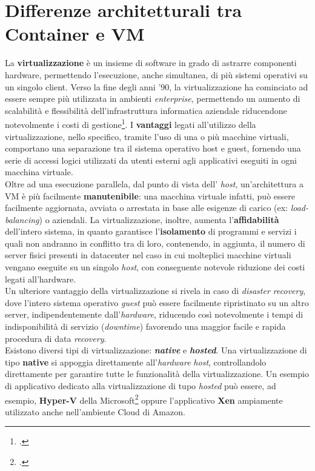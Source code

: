 \section{Differenze architetturali tra Container e VM}
La \textbf{virtualizzazione} è un insieme di software in grado di astrarre componenti \gls{hardware}, permettendo l'esecuzione, anche simultanea, di più \gls{sistemi operativi} su un singolo \gls{client}. Verso la fine degli anni '90, la virtualizzazione ha cominciato ad essere sempre più utilizzata in ambienti \textit{enterprise}, permettendo un aumento di scalabilità e flessibilità dell'infrastruttura informatica aziendale riducendone notevolmente i costi di gestione\footcite{fonte: https://www.vmware.com/it/solutions/virtualization.html}. I \textbf{vantaggi} legati all'utilizzo della virtualizzazione, nello specifico, tramite l'uso di una o più macchine virtuali, comportano una separazione tra il sistema operativo \gls{host} e \gls{guest}, fornendo una serie di accessi logici utilizzati da utenti esterni agli applicativi eseguiti in ogni macchina virtuale. \\
Oltre ad una esecuzione parallela, dal punto di vista dell' \textit{host}, un'architettura a VM è più facilmente \textbf{manutenibile}: una macchina virtuale infatti, può essere facilmente aggiornata, avviata o arrestata in base alle esigenze di carico (ex: \textit{\gls{load-balancing}}) o aziendali.
La virtualizzazione, inoltre, aumenta l'\textbf{affidabilità} dell'intero sistema, in quanto garantisce l'\textbf{isolamento} di programmi e servizi i quali non andranno in conflitto tra di loro, contenendo, in aggiunta, il numero di server fisici presenti in \gls{datacenter} nel caso in cui molteplici macchine virtuali vengano eseguite su un singolo \textit{host}, con conseguente notevole riduzione dei costi legati all'hardware.\\
Un ulteriore vantaggio della virtualizzazione si rivela in caso di \textit{\gls{disaster recovery}}, dove l'intero sistema operativo \textit{guest} può essere facilmente ripristinato su un altro server, indipendentemente dall'\textit{hardware}, riducendo così notevolmente i tempi di indisponibilità di servizio (\textit{downtime})  favorendo una maggior facile e rapida procedura di data \textit{\gls{recovery}}.\\
Esistono diversi tipi di virtualizzazione: \textbf{\textit{native}} e \textbf{\textit{hosted}}.
Una virtualizzazione di tipo \textbf{native} si appoggia direttamente all'\textit{hardware} \textit{host}, controllandolo direttamente per garantire tutte le funzionalità della virtualizzazione. Un esempio di applicativo dedicato alla virtualizzazione di tupo \textit{hosted} può essere, ad esempio, \textbf{\gls{Hyper-V}} della Microsoft\footcite{questa funzionalita' e' presente solamente nelle versioni Pro e Server di Windows 10} oppure l'applicativo \textbf{\gls{Xen}} ampiamente utilizzato anche nell'ambiente Cloud di Amazon.
